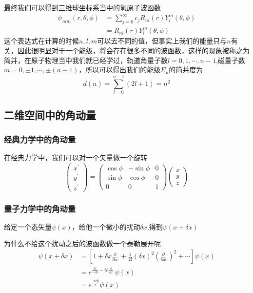 \documentclass{article}
\newcommand{\pmthree}[9]{
    \begin{pmatrix}
        #1&#2&#3\\
        #4&#5&#6\\
        #7&#8&#9
    \end{pmatrix}
}
\newcommand{\Da}[2]{\frac{\partial}{\partial#2}#1}
\begin{document}
最终我们可以得到三维球坐标系当中的氢原子波函数
\begin{align*}
	\psi_{nlm}(r,\theta,\phi) & =\sum_{j=0}^{\infty}c_{j}R_{nl}(r)Y_{l}^m(\theta,\phi) \\
	                          & =R_{nl}(r)Y_{l}^{m}(\theta,\phi)
\end{align*}
这个表达式在计算的时候$n,l,m$可以去不同的值，但事实上我们的能量只与$n$有关，因此很明显对于一个能级，将会存在很多不同的波函数，这样的现象被称之为简并，在原子物理当中我们就已经学过，轨道角量子数$l=0,1,\cdots,n-1$,磁量子数$m=0,\pm 1,\cdots,\pm (n-1)$，所以可以得出我们的能级$E_n$的简并度为
\begin{equation*}
	d(n)=\sum_{l=0}^{n-1}(2l+1)=n^2
\end{equation*}

\subsection{二维空间中的角动量}
\subsubsection{经典力学中的角动量}
在经典力学中，我们可以对一个矢量做一个旋转
\begin{equation*}
	\begin{pmatrix}
		x^{'} \\
		y^{'} \\
		z^{'}
	\end{pmatrix}
	=
	\pmthree{\cos\phi}{-\sin\phi}{0}{\sin\phi}{\cos\phi}{0}{0}{0}{1}
	\begin{pmatrix}
		x \\
		y \\
		z
	\end{pmatrix}
\end{equation*}

\subsubsection{量子力学中的角动量}
给定一个态矢量$\psi(x)$，给他一个微小的扰动$\delta x$,得到$\psi(x+\delta x)$

为什么不给这个扰动之后的波函数做一个泰勒展开呢
\begin{align*}
	\psi(x+\delta x) & =\left[1+\delta x\Da{~}{x}+\frac{1}{2!}(\delta x)^2\left(\Da{~}{x}\right)^2+\cdots\right]\psi(x) \\
	                 & =e^{\frac{\delta x}{-i\hbar}-i\hbar\Da{~}{x}}\psi(x)                                             \\
	                 & =e^{\frac{\Delta x \hat{p}}{\hbar}}\psi(x)
\end{align*}
\end{document}
